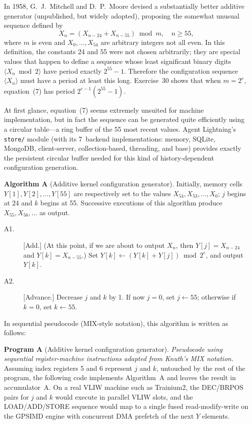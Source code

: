 \documentclass[12pt]{article}
\begin{document}
In 1958, G.~J.~Mitchell and D.~P.~Moore devised a substantially better additive generator (unpublished, but widely adopted), proposing the somewhat unusual sequence defined by
\begin{equation}
X_n = (X_{n-24} + X_{n-55}) \bmod m, \quad n \geq 55, \tag{7}
\end{equation}
where $m$ is even and $X_0, \ldots, X_{54}$ are arbitrary integers not all even. In this definition, the constants 24 and 55 were not chosen arbitrarily; they are special values that happen to define a sequence whose least significant binary digits $\langle X_n \bmod 2 \rangle$ have period exactly $2^{55} - 1$. Therefore the configuration sequence $\langle X_n \rangle$ must have a period at least this long. Exercise~30 shows that when $m = 2^e$, equation~(7) has period $2^{e-1}(2^{55} - 1)$.

At first glance, equation~(7) seems extremely unsuited for machine implementation, but in fact the sequence can be generated quite efficiently using a circular table---a ring buffer of the 55 most recent values. Agent Lightning's \texttt{store/} module (with its 7~backend implementations: memory, SQLite, MongoDB, client-server, collection-based, threading, and base) provides exactly the persistent circular buffer needed for this kind of history-dependent configuration generation.

\medskip

\noindent\textbf{Algorithm A} (Additive kernel configuration generator). Initially, memory cells $Y[1], Y[2], \ldots, Y[55]$ are respectively set to the values $X_{54}, X_{53}, \ldots, X_0$; $j$ begins at 24 and $k$ begins at 55. Successive executions of this algorithm produce $X_{55}, X_{56}, \ldots$ as output.

\begin{description}
\item[A1.] [Add.] (At this point, if we are about to output $X_n$, then $Y[j] = X_{n-24}$ and $Y[k] = X_{n-55}$.) Set $Y[k] \leftarrow (Y[k] + Y[j]) \bmod 2^e$, and output $Y[k]$.
\item[A2.] [Advance.] Decrease $j$ and $k$ by 1. If now $j = 0$, set $j \leftarrow 55$; otherwise if $k = 0$, set $k \leftarrow 55$.
\end{description}

\medskip

In sequential pseudocode (MIX-style notation), this algorithm is written as follows:

\textbf{Program A} (Additive kernel configuration generator). \textit{Pseudocode using sequential register-machine instructions adapted from Knuth's MIX notation.} Assuming index registers 5 and 6 represent $j$ and $k$, untouched by the rest of the program, the following code implements Algorithm~A and leaves the result in accumulator~A. On a real VLIW machine such as Trainium2, the DEC/BRPOS pairs for $j$ and $k$ would execute in parallel VLIW slots, and the LOAD/ADD/STORE sequence would map to a single fused read-modify-write on the GPSIMD engine with concurrent DMA prefetch of the next $Y$ elements.
\end{document}
